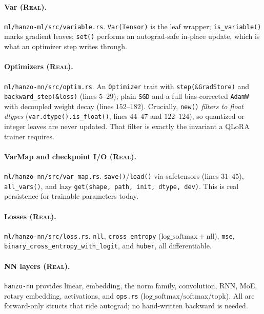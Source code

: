 \documentclass[11pt]{article}
\begin{document}
\paragraph{Var (\textsc{Real}).} \texttt{ml/hanzo-ml/src/variable.rs}. \texttt{Var(Tensor)} is the leaf wrapper; \texttt{is\_variable()} marks gradient leaves; \texttt{set()} performs an autograd-safe in-place update, which is what an optimizer step writes through.

\paragraph{Optimizers (\textsc{Real}).} \texttt{ml/hanzo-nn/src/optim.rs}. An \texttt{Optimizer} trait with \texttt{step(\&GradStore)} and \texttt{backward\_step(\&loss)} (lines $5$--$29$); plain \texttt{SGD} and a full bias-corrected \texttt{AdamW} with decoupled weight decay (lines $152$--$182$). Crucially, \texttt{new()} \emph{filters to float dtypes} (\texttt{var.dtype().is\_float()}, lines $44$--$47$ and $122$--$124$), so quantized or integer leaves are never updated. That filter is exactly the invariant a QLoRA trainer requires.

\paragraph{VarMap and checkpoint I/O (\textsc{Real}).} \texttt{ml/hanzo-nn/src/var\_map.rs}. \texttt{save()}/\texttt{load()} via safetensors (lines $31$--$45$), \texttt{all\_vars()}, and lazy \texttt{get(shape, path, init, dtype, dev)}. This is real persistence for trainable parameters today.

\paragraph{Losses (\textsc{Real}).} \texttt{ml/hanzo-nn/src/loss.rs}. \texttt{nll}, \texttt{cross\_entropy} ($\mathrm{log\_softmax} + \mathrm{nll}$), \texttt{mse}, \texttt{binary\_cross\_entropy\_with\_logit}, and \texttt{huber}, all differentiable.

\paragraph{NN layers (\textsc{Real}).} \texttt{hanzo-nn} provides linear, embedding, the norm family, convolution, RNN, MoE, rotary embedding, activations, and \texttt{ops.rs} ($\mathrm{log\_softmax}$/$\mathrm{softmax}$/$\mathrm{topk}$). All are forward-only structs that ride autograd; no hand-written backward is needed.
\end{document}
